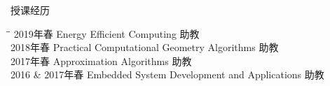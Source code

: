 
\begin{rSection}{授课经历}
\begin{tabbing}
\hspace{1.5in}\= \hspace{3.5in}\=\kill
    2019年春 \> Energy Efficient Computing \> 助教\\
    2018年春 \> Practical Computational Geometry Algorithms \> 助教 \\
    2017年春 \> Approximation Algorithms \> 助教 \\
    2016 \& 2017年春 \>  Embedded System Development and Applications \> 助教 
\end{tabbing}
\end{rSection}

